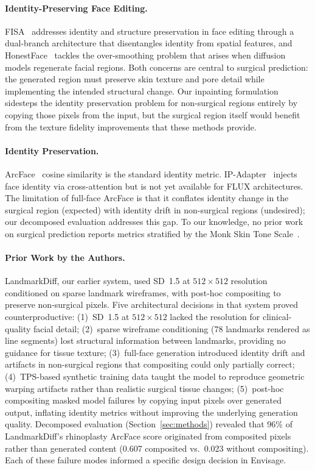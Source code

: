 \documentclass[runningheads]{llncs}
\newcommand{\method}{Envisage}
\begin{document}
\paragraph{Identity-Preserving Face Editing.}
FISA~\cite{fisa2026} addresses identity and structure preservation in
face editing through a dual-branch architecture that disentangles identity
from spatial features, and HonestFace~\cite{honestface2025} tackles the
over-smoothing problem that arises when diffusion models regenerate
facial regions. Both concerns are central to surgical prediction:
the generated region must preserve skin texture and pore detail
while implementing the intended structural change. Our inpainting
formulation sidesteps the identity preservation problem for non-surgical
regions entirely by copying those pixels from the input, but the surgical
region itself would benefit from the texture fidelity improvements that
these methods provide.

\paragraph{Identity Preservation.}
ArcFace~\cite{deng2019arcface} cosine similarity is the standard identity
metric. IP-Adapter~\cite{ye2023ipadapter} injects face identity via
cross-attention but is not yet available for FLUX architectures. The
limitation of full-face ArcFace is that it conflates identity change in
the surgical region (expected) with identity drift in non-surgical regions
(undesired); our decomposed evaluation addresses this gap. To our knowledge,
no prior work on surgical prediction reports metrics stratified by the Monk
Skin Tone Scale~\cite{monk2023monk}.

\paragraph{Prior Work by the Authors.}
LandmarkDiff, our earlier system, used SD~1.5 at $512 \times 512$ resolution
conditioned on sparse landmark wireframes, with post-hoc compositing to
preserve non-surgical pixels. Five architectural decisions in that system
proved counterproductive: (1)~SD~1.5 at $512 \times 512$ lacked the
resolution for clinical-quality facial detail; (2)~sparse wireframe
conditioning (78 landmarks rendered as line segments) lost structural
information between landmarks, providing no guidance for tissue texture;
(3)~full-face generation introduced identity drift and artifacts in
non-surgical regions that compositing could only partially correct;
(4)~TPS-based synthetic training data taught the model to reproduce
geometric warping artifacts rather than realistic surgical tissue changes;
(5)~post-hoc compositing masked model failures by copying input pixels over
generated output, inflating identity metrics without improving the
underlying generation quality. Decomposed evaluation (Section~\ref{sec:methods})
revealed that 96\% of LandmarkDiff's rhinoplasty ArcFace score originated from
composited pixels rather than generated content (0.607 composited vs.\
0.023 without compositing). Each of these failure modes informed a specific
design decision in \method{}.
\end{document}
